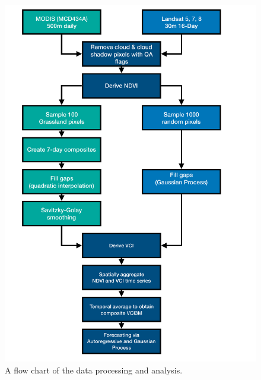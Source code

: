 \documentclass[review]{elsarticle}
\begin{document}




\newpage

\begin{figure} 
	\centering
	\includegraphics[trim = 0mm 0mm 0mm 20mm,width=11.5 cm]{figures/Flowchart-V2.pdf}
	\caption{A flow chart of the data processing and analysis.} \label{fig:flowchart}
\end{figure}
\newpage
\end{document}
